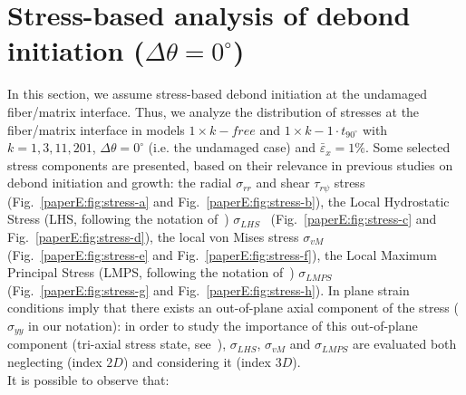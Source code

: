 \section{Stress-based analysis of debond initiation ($\Delta\theta=0^{\circ}$)}\label{paperE:sec:stress}

In this section, we assume stress-based debond initiation at the undamaged fiber/matrix interface. Thus, we analyze the distribution of stresses at the fiber/matrix interface in models $1\times k-free$ and $1\times k-1\cdot t_{90^{\circ}}$ with $k=1,3,11,201$, $\Delta\theta=0^{\circ}$ (i.e. the undamaged case) and $\bar{\varepsilon}_{x}=1\%$. Some selected stress components are presented, based on their relevance in previous studies on debond initiation and growth: the radial $\sigma_{rr}$ and shear $\tau_{r\psi}$ stress~\cite{Mantic2009} (Fig.~\ref{paperE:fig:stress-a} and Fig.~\ref{paperE:fig:stress-b}), the Local Hydrostatic Stress (LHS, following the notation of~\cite{Carraro2016}) $\sigma_{LHS}$~\cite{Asp1996a,Asp1996b} (Fig.~\ref{paperE:fig:stress-c} and Fig.~\ref{paperE:fig:stress-d}), the local von Mises stress $\sigma_{vM}$~\cite{Canal2012}  (Fig.~\ref{paperE:fig:stress-e} and Fig.~\ref{paperE:fig:stress-f}), the Local Maximum Principal Stress (LMPS, following the notation of~\cite{Carraro2016}) $\sigma_{LMPS}$~\cite{Carraro2014}  (Fig.~\ref{paperE:fig:stress-g} and Fig.~\ref{paperE:fig:stress-h}). In plane strain conditions imply that there exists an out-of-plane axial component of the stress ($\sigma_{yy}$ in our notation): in order to study the importance of this out-of-plane component (tri-axial stress state, see~\cite{Asp1995}), $\sigma_{LHS}$, $\sigma_{vM}$ and $\sigma_{LMPS}$ are evaluated both neglecting (index $2D$) and considering it (index $3D$).\\
It is possible to observe that:
\vspace{-5pt}
